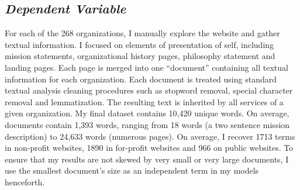 \documentclass[
  12pt,
]{article}
\begin{document}
\hypertarget{dependent-variable}{%
\subsection{\texorpdfstring{\emph{Dependent Variable}}{Dependent Variable}}\label{dependent-variable}}

For each of the 268 organizations, I manually explore the website and gather textual information. I focused on elements of presentation of self, including mission statements, organizational history pages, philosophy statement and landing pages. Each page is merged into one ``document'' containing all textual information for each organization. Each document is treated using standard textual analysis cleaning procedures such as stopword removal, special character removal and lemmatization. The resulting text is inherited by all services of a given organization. My final dataset contains 10,420 unique words. On average, documents contain 1,393 words, ranging from 18 words (a two sentence mission description) to 24,633 words (numerous pages). On average, I recover 1713 terms in non-profit websites, 1890 in for-profit websites and 966 on public websites. To ensure that my results are not skewed by very small or very large documents, I use the smallest document's size as an independent term in my models henceforth.
\end{document}
